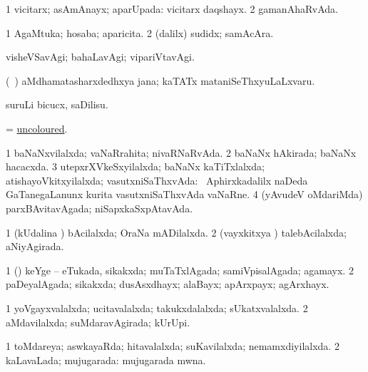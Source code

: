 \bentry
{} 
\gl{\gu}
\expl{}
\bmng
\bnum
\num{1} vicitarx; asAmAnayx; aparUpada:  vicitarx daqshayx. 
\num{2} gamanAhaRvAda. 
\enum
\emng
\eentry

\bentry
{} 
\gl{\nA}
\expl{}
\bmng
\bnum
\num{1} AgaMtuka; hosaba; aparicita. 
\num{2} (\bava dalilx) sudidx; samAcAra. 
\enum
\emng
\eentry

\bentry
{} 
\gl{\kirxvi}
\expl{}
\bmng
visheVSavAgi; bahaLavAgi; vipariVtavAgi. 
\emng

\noindent 
\gl{\pagu}
\expl{}
\bmng
{} (\kanmu\ \hiV) aMdhamatasharxdedhxya jana; kaTATx mataniSeThxyuLaLxvaru. 
\emng
\eentry

\bentry
{} 
\gl{\sakirx}
\expl{}
\bmng
suruLi bicucx, saDilisu. 
\emng
\eentry

\bentry
{} 
\gl{\gu}
\expl{(\ame) }
\bmng
= \hyperlink{uncoloured}{uncoloured}. 
\emng
\eentry

\bentry
{} 
\gl{\gu}
\expl{}
\bmng
\bnum
\num{1} baNaNxvilalxda; vaNaRrahita; nivaRNaRvAda. 
\num{2} baNaNx hAkirada; baNaNx hacacxda. 
\num{3} utepxrXVkeSxyilalxda; baNaNx kaTiTxlalxda; atishayoVkitxyilalxda; vasutxniSaThxvAda:  \da\ Aphirxkadalilx naDeda GaTanegaLanunx kurita vasutxniSaThxvAda vaNaRne. 
\num{4} (yAvudeV oMdariMda) parxBAvitavAgada; niSapxkaSxpAtavAda. 
\enum
\emng
\eentry

\bentry
{} 
\gl{\gu}
\expl{}
\bmng
\bnum
\num{1} (kUdalina \vi) bAcilalxda; OraNa mADilalxda. 
\num{2} (vayxkitxya \vi) talebAcilalxda; aNiyAgirada. 
\enum
\emng
\eentry

\bentry
{} 
\gl{\gu}
\expl{}
\bmng
\bnum
\num{1} (\AmA) keYge -- eTukada, sikakxda; muTaTxlAgada; samiVpisalAgada; agamayx. 
\num{2} paDeyalAgada; sikakxda; dusAsxdhayx; alaBayx; apArxpayx; agArxhayx. 
\enum
\emng
\eentry

\bentry
{} 
\gl{\gu}
\expl{}
\bmng
\bnum
\num{1} yoVgayxvalalxda; ucitavalalxda; takukxdalalxda; sUkatxvalalxda. 
\num{2} aMdavilalxda; suMdaravAgirada; kUrUpi. 
\enum
\emng
\eentry

\bentry
{} 
\gl{\gu}
\expl{}
\bmng
\bnum
\num{1} toMdareya; aswkayaRda; hitavalalxda; suKavilalxda; nemamxdiyilalxda. 
\num{2} kaLavaLada; mujugarada:  mujugarada mwna. 
\enum
\emng
\eentry

